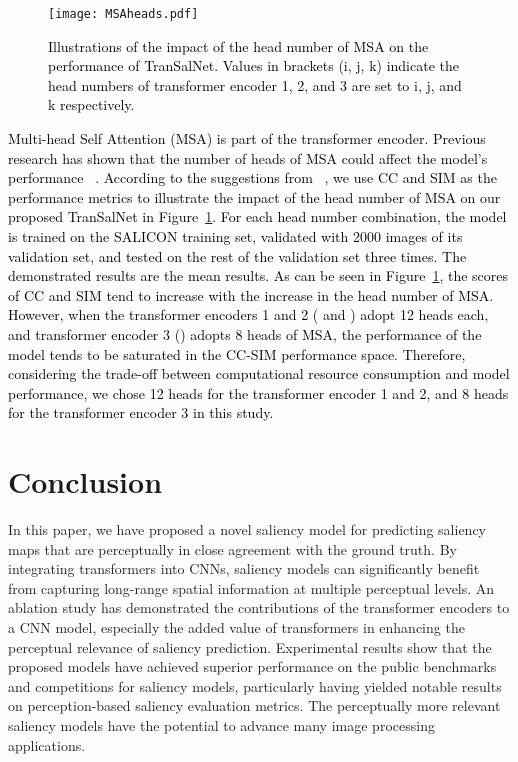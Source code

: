 \documentclass{article}
\begin{document}
\begin{figure}
\centering
\texttt{[image: MSAheads.pdf]}
\caption{\textcolor{black}{Illustrations of the impact of the head number of MSA on the performance of TranSalNet. Values in brackets (i, j, k) indicate the head numbers of transformer encoder 1, 2, and 3 are set to i, j, and k respectively.}}
\label{fig:heads}
\end{figure}

\textcolor{black}{
Multi-head Self Attention (MSA) is part of the transformer encoder. Previous research has shown that the number of heads of MSA could affect the model's performance ~\cite{heads2}. 
According to the suggestions from ~\cite{Bylinskii_2019}, we use CC and SIM as the performance metrics to illustrate the impact of the head number of MSA on our proposed TranSalNet in Figure~\ref{fig:heads}. For each head number combination, the model is trained on the SALICON training set, validated with 2000 images of its validation set, and tested on the rest of the validation set three times. The demonstrated results are the mean results. As can be seen in Figure~\ref{fig:heads}, the scores of CC and SIM tend to increase with the increase in the head number of MSA. However, when the transformer encoders 1 and 2 ( and ) adopt 12 heads each, and transformer encoder 3 () adopts 8 heads of MSA, the performance of the model tends to be saturated in the CC-SIM performance space. Therefore, considering the trade-off between computational resource consumption and model performance, we chose 12 heads for the transformer encoder 1 and 2, and 8 heads for the transformer encoder 3 in this study.
}

\section{Conclusion}


In this paper, we have proposed a novel saliency model for predicting saliency maps that are perceptually in close agreement with the ground truth. By integrating transformers into CNNs, saliency models can significantly benefit from capturing long-range spatial information at multiple perceptual levels. An ablation study has demonstrated the contributions of the transformer encoders to a CNN model, especially the added value of transformers in enhancing the perceptual relevance of saliency prediction. Experimental results show that the proposed models have achieved superior performance on the public benchmarks and competitions for saliency models, particularly having yielded notable results on perception-based saliency evaluation metrics. The perceptually more relevant saliency models have the potential to advance many image processing applications.
\end{document}
